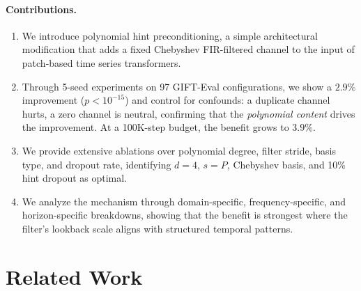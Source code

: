 \documentclass[11pt]{article}
\begin{document}
\paragraph{Contributions.}
\begin{enumerate}
    \item We introduce polynomial hint preconditioning, a simple architectural modification that adds a fixed Chebyshev FIR-filtered channel to the input of patch-based time series transformers.
    \item Through 5-seed experiments on 97 GIFT-Eval configurations, we show a $2.9\%$ improvement ($p < 10^{-15}$) and control for confounds: a duplicate channel hurts, a zero channel is neutral, confirming that the \emph{polynomial content} drives the improvement. At a 100K-step budget, the benefit grows to $3.9\%$.
    \item We provide extensive ablations over polynomial degree, filter stride, basis type, and dropout rate, identifying $d=4$, $s=P$, Chebyshev basis, and 10\% hint dropout as optimal.
    \item We analyze the mechanism through domain-specific, frequency-specific, and horizon-specific breakdowns, showing that the benefit is strongest where the filter's lookback scale aligns with structured temporal patterns.
\end{enumerate}

\section{Related Work}
\end{document}
